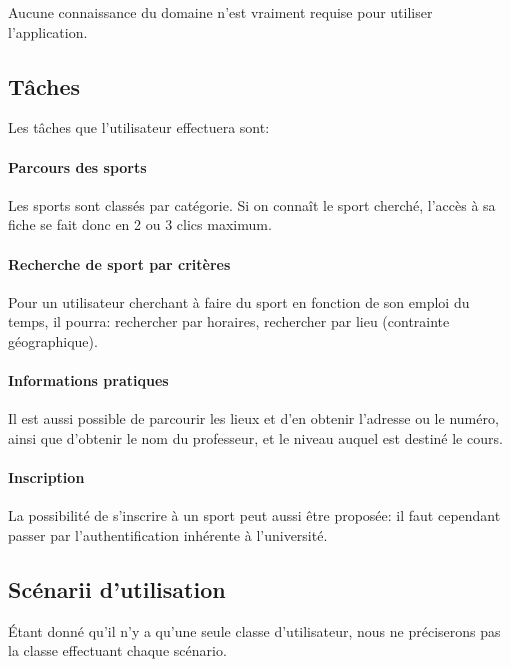 \documentclass[french, titlepage, 11pt, a4paper]{article}
\begin{document}
		Aucune connaissance du domaine n'est vraiment requise pour utiliser
		l'application.

	\subsection{Tâches}

	 Les tâches que l'utilisateur effectuera sont:

	    \paragraph{Parcours des sports}

	        Les sports sont classés par catégorie. Si on connaît le sport
	        cherché, l'accès à sa fiche se fait donc en 2 ou 3 \og clics\fg{}
	        maximum.

        \paragraph{Recherche de sport par critères}

            Pour un utilisateur cherchant à faire du sport en fonction de son
            emploi du temps, il pourra: rechercher par horaires, rechercher par
            lieu (contrainte géographique).

        \paragraph{Informations pratiques}

            Il est aussi possible de parcourir les lieux et d'en obtenir
            l'adresse ou le numéro, ainsi que d'obtenir le nom du
            professeur, et le niveau auquel est destiné le cours.

        \paragraph{Inscription}

            La possibilité de s'inscrire à un sport peut aussi être proposée: il
            faut cependant passer par l'authentification inhérente à
            l'université.


    \subsection{Scénarii d'utilisation}

    Étant donné qu'il n'y a qu'une seule classe d'utilisateur, nous ne
    préciserons pas la classe effectuant chaque scénario.
\end{document}
